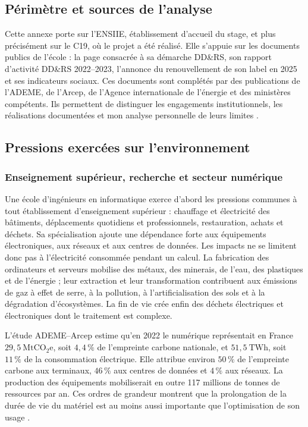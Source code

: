
\subsection{Périmètre et sources de l'analyse}
\label{ssec:ddrs_perimetre}

Cette annexe porte sur l'ENSIIE, établissement d'accueil du stage, et plus
précisément sur le C19, où le projet a été réalisé. Elle s'appuie sur les
documents publics de l'école : la page consacrée à sa démarche DD\&RS, son
rapport d'activité DD\&RS 2022--2023, l'annonce du renouvellement de son label
en 2025 et ses indicateurs sociaux. Ces documents sont complétés par des
publications de l'ADEME, de l'Arcep, de l'Agence internationale de l'énergie et
des ministères compétents. Ils permettent de distinguer les engagements
institutionnels, les réalisations documentées et mon analyse personnelle de
leurs limites \cite{ensiieDDRS2026,ensiieRapportDDRS2023,ensiieLabelDDRS2025}.

\subsection{Pressions exercées sur l'environnement}
\label{ssec:ddrs_pressions}

\subsubsection{Enseignement supérieur, recherche et secteur numérique}

Une école d'ingénieurs en informatique exerce d'abord les pressions communes à
tout établissement d'enseignement supérieur : chauffage et électricité des
bâtiments, déplacements quotidiens et professionnels, restauration, achats et
déchets. Sa spécialisation ajoute une dépendance forte aux équipements
électroniques, aux réseaux et aux centres de données. Les impacts ne se
limitent donc pas à l'électricité consommée pendant un calcul. La fabrication
des ordinateurs et serveurs mobilise des métaux, des minerais, de l'eau, des
plastiques et de l'énergie ; leur extraction et leur transformation contribuent
aux émissions de gaz à effet de serre, à la pollution, à l'artificialisation
des sols et à la dégradation d'écosystèmes. La fin de vie crée enfin des déchets
électriques et électroniques dont le traitement est complexe.

L'étude ADEME--Arcep estime qu'en 2022 le numérique représentait en France
$29{,}5~\mathrm{MtCO_2e}$, soit $4{,}4\,\%$ de l'empreinte carbone nationale,
et $51{,}5~\mathrm{TWh}$, soit $11\,\%$ de la consommation électrique. Elle
attribue environ $50\,\%$ de l'empreinte carbone aux terminaux, $46\,\%$ aux
centres de données et $4\,\%$ aux réseaux. La production des équipements
mobiliserait en outre 117 millions de tonnes de ressources par an. Ces ordres
de grandeur montrent que la prolongation de la durée de vie du matériel est au
moins aussi importante que l'optimisation de son usage
\cite{ademeEmpreinteNumerique2025}.

